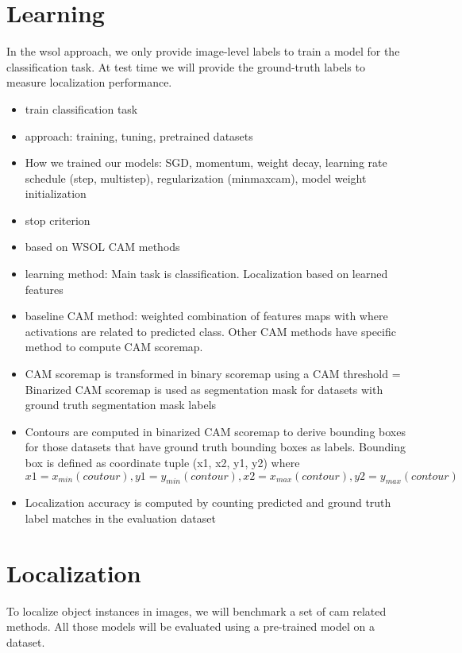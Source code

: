 \section{Learning}
In the \acrlong{wsol} approach, we only provide image-level labels to train a model for the classification task. At test time we will provide the ground-truth labels to measure localization performance.

\begin{itemize}
    \item train classification task
    \item approach: training, tuning, pretrained datasets
    \item How we trained our models: SGD, momentum, weight decay, learning rate schedule (step, multistep), regularization (minmaxcam), model weight initialization
    \item stop criterion
\end{itemize}

\begin{itemize}
    \item based on WSOL CAM methods
    \item learning method: Main task is classification. Localization based on learned features
    \item baseline CAM method: weighted combination of features maps with where activations are related to predicted class. Other CAM methods have specific method to compute CAM scoremap.
    \item CAM scoremap is transformed in binary scoremap using a CAM threshold = Binarized CAM scoremap is used as segmentation mask for datasets with ground truth segmentation mask labels
    \item Contours are computed in binarized CAM scoremap to derive bounding boxes for those datasets that have ground truth bounding boxes as labels. Bounding box is defined as coordinate tuple (x1, x2, y1, y2) where $x1 = x_{min}(coutour), y1 = y_{min}(contour), x2 = x_{max}(contour), y2 = y_{max}(contour)$
    \item Localization accuracy is computed by counting predicted and ground truth label matches in the evaluation dataset
\end{itemize}

\section{Localization}
To localize object instances in images, we will benchmark a set of \acrshort{cam} related methods. All those models will be evaluated using a pre-trained model on a dataset. 

